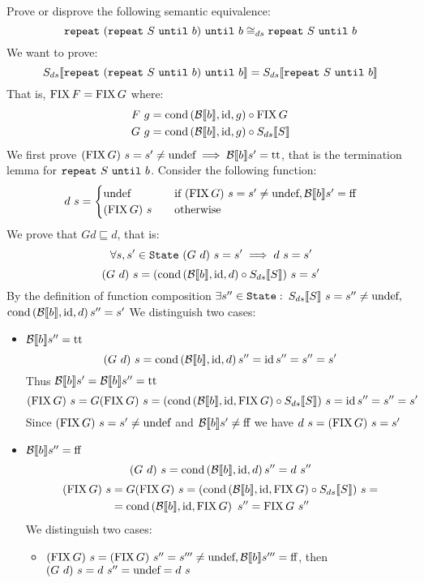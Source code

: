 \begin{exercise}{
    Prove or disprove the following semantic equivalence:
    \[ \wrepeat{(\wrepeat{S}{b})}{b} \DScong \wrepeat{S}{b} \]
}
    We want to prove:
    \[ \Sds{\wrepeat{(\wrepeat{S}{b})}{b}} = \Sds{\wrepeat{S}{b}} \]
    That is, $\FIX F = \FIX G$ where:
    \begin{align*}
        F\ g &= \cond{\Bool{b}}{\id}{g} \circ \FIX G \\
        G\ g &= \cond{\Bool{b}}{\id}{g} \circ \Sds{S}
    \end{align*}
    We first prove $(\FIX G)\ s = s' \neq \undef \implies \Bool{b} s' = \True$, that is the termination lemma for $\wrepeat{S}{b}$.
    Consider the following function:
    \[
        d\ s = \begin{cases}
            \undef &\quad \text{if } (\FIX G)\ s = s' \neq \undef, \Bool{b} s' = \False \\
            (\FIX G)\ s &\quad \text{otherwise}
        \end{cases}
    \]
    We prove that $G d \sqsubseteq d$, that is:
    \[ \forall s, s' \in \State\ (G\ d)\ s = s' \implies d\ s = s' \]
    \[ (G\ d)\ s = (\cond{\Bool{b}}{\id}{d} \circ \Sds{S})\ s = s' \]
    By the definition of function composition $\exists s'' \in \State :$ $\Sds{S}\ s = s'' \neq \undef,$ $\cond{\Bool{b}}{\id}{d} s'' = s'$
    We distinguish two cases:
    \begin{itemize}
        \item $\Bool{b} s'' = \True$
            \[ (G\ d)\ s = \cond{\Bool{b}}{\id}{d} s'' = \id s'' = s'' = s' \]
            Thus $\Bool{b} s' = \Bool{b} s'' = \True$
            \[ (\FIX G)\ s = G(\FIX G)\ s = (\cond{\Bool{b}}{\id}{\FIX G} \circ \Sds{S})\ s = \id s'' = s'' = s' \]
            Since $(\FIX G)\ s = s' \neq \undef$ and $\Bool{b} s' \neq \False$ we have $d\ s = (\FIX G)\ s = s'$
        \item $\Bool{b} s'' = \False$
            \[ (G\ d)\ s = \cond{\Bool{b}}{\id}{d} s'' = d\ s'' \]
            \begin{align*}
                (\FIX G)\ s &= G(\FIX G)\ s = (\cond{\Bool{b}}{\id}{\FIX G} \circ \Sds{S})\ s = \\
                &= \cond{\Bool{b}}{\id}{\FIX G}\ s'' = \FIX G\ s''
            \end{align*}
            We distinguish two cases:
            \begin{itemize}
                \item $(\FIX G)\ s = (\FIX G)\ s'' = s''' \neq \undef, \Bool{b} s''' = \False$, then $(G\ d)\ s = d\ s'' = \undef = d\ s$

\end{itemize}
\end{itemize}
\end{exercise}
